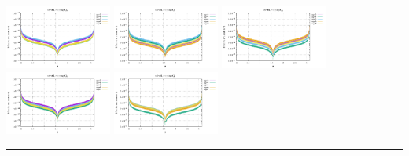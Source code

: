 \noindent
\includegraphics[width=3.5cm]{python_codes/fieldstone_152/RESULTS/exp1/sr2_128_m2}
\includegraphics[width=3.5cm]{python_codes/fieldstone_152/RESULTS/exp1/sr2_128_m3}
\includegraphics[width=3.5cm]{python_codes/fieldstone_152/RESULTS/exp1/sr2_128_m4}
\includegraphics[width=3.5cm]{python_codes/fieldstone_152/RESULTS/exp1/sr2_128_m5}
\includegraphics[width=3.5cm]{python_codes/fieldstone_152/RESULTS/exp1/sr2_128_m6}

\hrule

